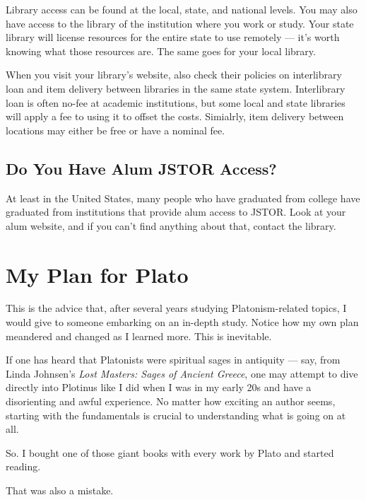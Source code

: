 \documentclass[
]{book}
\begin{document}
Library access can be found at the local, state, and national levels. You may also have access to the library of the institution where you work or study. Your state library will license resources for the entire state to use remotely --- it's worth knowing what those resources are. The same goes for your local library.

When you visit your library's website, also check their policies on interlibrary loan and item delivery between libraries in the same state system. Interlibrary loan is often no-fee at academic institutions, but some local and state libraries will apply a fee to using it to offset the costs. Simialrly, item delivery between locations may either be free or have a nominal fee.

\hypertarget{do-you-have-alum-jstor-access}{%
\subsection{Do You Have Alum JSTOR Access?}\label{do-you-have-alum-jstor-access}}

At least in the United States, many people who have graduated from college have graduated from institutions that provide alum access to JSTOR. Look at your alum website, and if you can't find anything about that, contact the library.

\hypertarget{my-plan-for-plato}{%
\section{My Plan for Plato}\label{my-plan-for-plato}}

This is the advice that, after several years studying Platonism-related topics, I would give to someone embarking on an in-depth study. Notice how my own plan meandered and changed as I learned more. This is inevitable.

If one has heard that Platonists were spiritual sages in antiquity --- say, from Linda Johnsen's \emph{Lost Masters: Sages of Ancient Greece}, one may attempt to dive directly into Plotinus like I did when I was in my early 20s and have a disorienting and awful experience. No matter how exciting an author seems, starting with the fundamentals is crucial to understanding what is going on at all.

So. I bought one of those giant books with every work by Plato and started reading.

That was also a mistake.
\end{document}
